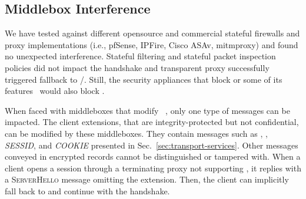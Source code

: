 



\subsection{Middlebox Interference}
\label{sec:middlebox}

We have tested \tcpls against different opensource and commercial stateful
firewalls and proxy implementations (i.e., pfSense, IPFire, Cisco ASAv,
mitmproxy) and found no unexpected interference. Stateful filtering and stateful
packet inspection policies did not impact the \tcpls handshake and transparent
\tls proxy successfully triggered \tcpls fallback to \tls/\tcp. Still, the security appliances that block  or some of its features~\cite{lee2019matls,Bock_China,raman2020measuring} would also block \tcpls.

When faced with middleboxes that modify ~\cite{Bock_China,raman2020measuring}, only one type of \tcpls messages can be impacted. The client \tls extensions, that are integrity-protected but not confidential, can be modified by these middleboxes. They contain messages such as \hello, \join, \textit{SESSID}, and \textit{COOKIE} presented
in Sec.~\ref{sec:transport-services}. Other messages conveyed in encrypted \tls records cannot be distinguished or tampered with. When a client opens a \tcpls session through a \tls terminating proxy not supporting \tcpls, it replies
with a \textsc{ServerHello} message omitting the \hello extension. Then, the client can implicitly fall back to \tls and continue with the handshake.


